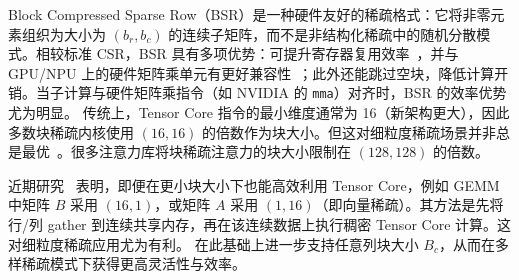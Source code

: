 Block Compressed Sparse Row（BSR）是一种硬件友好的稀疏格式：它将非零元素组织为大小为 $(b_r, b_c)$ 的连续子矩阵，而不是非结构化稀疏中的随机分散模式。相较标准 CSR，BSR 具有多项优势：可提升寄存器复用效率~\cite{im2004blocksparsity, buluc2009bsr}，并与 GPU/NPU 上的硬件矩阵乘单元有更好兼容性~\cite{narang2017bsr-rnn,gray2017gpu-bsr}；此外还能跳过空块，降低计算开销。当子计算与硬件矩阵乘指令（如 NVIDIA 的 \texttt{mma}）对齐时，BSR 的效率优势尤为明显。
传统上，Tensor Core 指令的最小维度通常为 16（新架构更大），因此多数块稀疏内核使用 $(16,16)$ 的倍数作为块大小。但这对细粒度稀疏场景并非总是最优~\cite{wang2023tcgnn}。很多注意力库将块稀疏注意力的块大小限制在 $(128,128)$ 的倍数。

近期研究~\cite{chen2021tensorcoressparsity, li2022magicube} 表明，即便在更小块大小下也能高效利用 Tensor Core，例如 GEMM 中矩阵 $B$ 采用 $(16,1)$，或矩阵 $A$ 采用 $(1,16)$（即向量稀疏）。其方法是先将行/列 gather 到连续共享内存，再在该连续数据上执行稠密 Tensor Core 计算。这对细粒度稀疏应用尤为有利。
\sys 在此基础上进一步支持任意列块大小 $B_c$，从而在多样稀疏模式下获得更高灵活性与效率。
